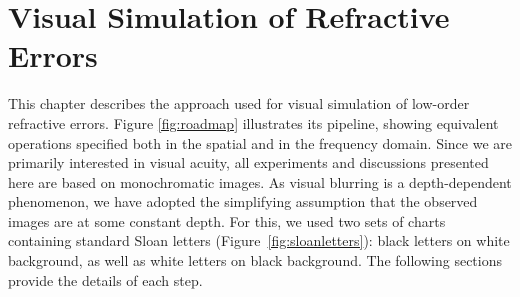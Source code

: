 
\chapter{Visual Simulation of Refractive Errors} %
\label{chap:Methods}

This chapter describes the approach used for visual simulation of low-order refractive errors. 
Figure \ref{fig:roadmap} illustrates its pipeline, showing equivalent operations specified both in the spatial and in the frequency domain. 
%
Since we are primarily interested in visual acuity, all experiments and discussions presented here are based on monochromatic images. 
As visual blurring is a depth-dependent phenomenon, we have adopted the simplifying assumption that the observed images are at some constant depth. For this, we used two sets of charts containing standard Sloan letters (Figure~\ref{fig:sloanletters}): black letters on white background, as well as white letters on black background. 
The following sections provide the details of each step.    


